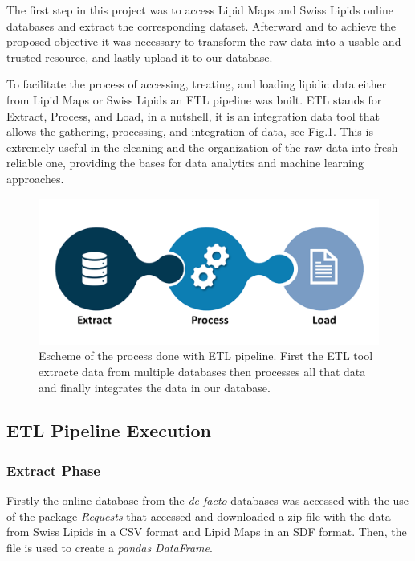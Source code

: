 \documentclass{llncs}
\begin{document}
The first step in this project was to access Lipid Maps and Swiss Lipids online databases and extract the corresponding dataset.
Afterward and to achieve the proposed objective it was necessary to transform the raw data into a  usable and trusted resource, and lastly upload it to our database.
 
To facilitate the process of accessing, treating, and loading lipidic data either from Lipid Maps or Swiss Lipids an ETL pipeline was built.
ETL stands for Extract, Process, and Load, in a nutshell, it is an integration data tool that allows the gathering, processing, and integration of data, see Fig.\ref{fig4}. 
This is extremely useful in the cleaning and the organization of the raw data into fresh reliable one, providing the bases for data analytics and machine learning approaches. 

\begin{figure}
    \includegraphics[width=\textwidth]{imagens/ETL.png}
    \caption{Escheme of the process done with ETL pipeline.
    First the ETL tool extracte data from multiple databases
    then processes all that data
    and finally integrates the data in our database.} \label{fig4}    
\end{figure}

\subsection{ETL Pipeline Execution}
\subsubsection{Extract Phase}

Firstly the online database from the \textit{de facto} databases was accessed with the use of the package \textit{Requests} that accessed and downloaded a zip file with the data from Swiss Lipids in a CSV format and Lipid Maps in an SDF format. Then,
the file is used to create a \textit{pandas DataFrame}. 
\end{document}
